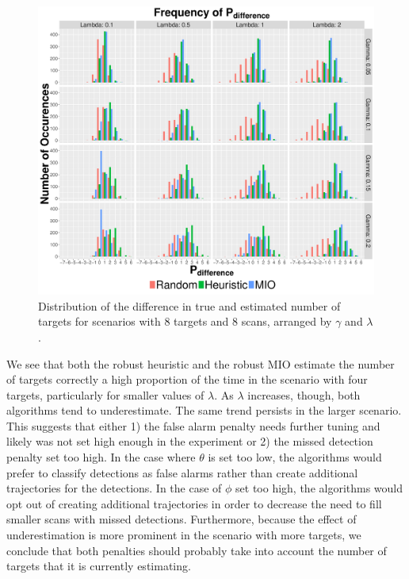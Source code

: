\begin{figure}[ht]
  \centering
  \includegraphics[width=\columnwidth]{../Figures/8_8_Histogram}
  \caption{Distribution of the difference in true and estimated number of targets for scenarios with 8 targets and 8 scans, arranged by $\gamma$ and $\lambda$.}
  \label{fig:Robust_8_8_Histogram}
\end{figure}

We see that both the robust heuristic and the robust MIO estimate the number of targets correctly a high proportion of the time in the scenario with four targets, particularly for smaller values of $\lambda$. As $\lambda$ increases, though, both algorithms tend to underestimate. The same trend persists in the larger scenario. This suggests that either 1) the false alarm penalty needs further tuning and likely was not set high enough in the experiment or 2) the missed detection penalty set too high. In the case where $\theta$ is set too low, the algorithms would prefer to classify detections as false alarms rather than create additional trajectories for the detections. In the case of $\phi$ set too high, the algorithms would opt out of creating additional trajectories in order to decrease the need to fill smaller scans with missed detections. Furthermore, because the effect of underestimation is more prominent in the scenario with more targets, we conclude that both penalties should probably take into account the number of targets that it is currently estimating.

